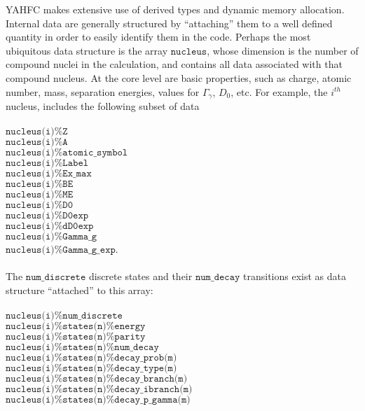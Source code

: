 \documentclass[
10pt,
showpacs,preprintnumbers,footinbib,
amsfonts,amsmath,amssymb,
aps,
prc,twocolumn,groupedaddress,superscriptaddress,
showkeys,
nofootinbib
]{revtex4-1}
\begin{document}
YAHFC makes extensive use of derived types and dynamic memory allocation. Internal data are generally structured by ``attaching'' them to a well defined quantity in order to easily identify them in the code. Perhaps the most ubiquitous data structure is the array ${\texttt{nucleus}}$, whose dimension is the number of compound nuclei in the calculation, and contains all data associated with that compound nucleus. At the core level are basic properties, such as charge, atomic number, mass, separation energies, values for $\Gamma_\gamma$, $D_0$, etc. For example, the $i^{th}$ nucleus, includes the following subset of data \\
\\
${\texttt{nucleus(i)\%Z}}$\\
${\texttt{nucleus(i)\%A}}$\\
${\texttt{nucleus(i)\%atomic\_symbol}}$\\
${\texttt{nucleus(i)\%Label}}$\\
${\texttt{nucleus(i)\%Ex\_max}}$\\
${\texttt{nucleus(i)\%BE}}$\\
${\texttt{nucleus(i)\%ME}}$\\
${\texttt{nucleus(i)\%D0}}$\\
${\texttt{nucleus(i)\%D0exp}}$\\
${\texttt{nucleus(i)\%dD0exp}}$\\
${\texttt{nucleus(i)\%Gamma\_g}}$\\
${\texttt{nucleus(i)\%Gamma\_g\_exp}}$.\\
\\
The ${\texttt{num\_discrete}}$ discrete states and their ${\texttt{num\_decay}}$ transitions exist as data structure ``attached'' to this array:\\
\\
${\texttt{nucleus(i)\%num\_discrete}}$\\
${\texttt{nucleus(i)\%states(n)\%energy}}$\\
${\texttt{nucleus(i)\%states(n)\%parity}}$\\
${\texttt{nucleus(i)\%states(n)\%num\_decay}}$\\
${\texttt{nucleus(i)\%states(n)\%decay\_prob(m)}}$\\
${\texttt{nucleus(i)\%states(n)\%decay\_type(m)}}$\\
${\texttt{nucleus(i)\%states(n)\%decay\_branch(m)}}$\\
${\texttt{nucleus(i)\%states(n)\%decay\_ibranch(m)}}$\\
${\texttt{nucleus(i)\%states(n)\%decay\_p\_gamma(m)}}$\\
\end{document}
